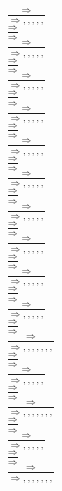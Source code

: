 \documentclass[11pt]{article}
\begin{document}
\begin{center}
\bigskip
\\$\frac{\Rightarrow }{\Rightarrow , , , , , }$
\bigskip
\\$\frac{\Rightarrow }{\Rightarrow }$
\bigskip
\\$\frac{\Rightarrow }{\Rightarrow , , , , , }$
\bigskip
\\$\frac{\Rightarrow }{\Rightarrow }$
\bigskip
\\$\frac{\Rightarrow }{\Rightarrow , , , , , }$
\bigskip
\\$\frac{\Rightarrow }{\Rightarrow }$
\bigskip
\\$\frac{\Rightarrow }{\Rightarrow , , , , , }$
\bigskip
\\$\frac{\Rightarrow }{\Rightarrow }$
\bigskip
\\$\frac{\Rightarrow }{\Rightarrow , , , , , }$
\bigskip
\\$\frac{\Rightarrow }{\Rightarrow }$
\bigskip
\\$\frac{\Rightarrow }{\Rightarrow , , , , , }$
\bigskip
\\$\frac{\Rightarrow }{\Rightarrow }$
\bigskip
\\$\frac{\Rightarrow }{\Rightarrow , , , , , }$
\bigskip
\\$\frac{\Rightarrow }{\Rightarrow }$
\bigskip
\\$\frac{\Rightarrow }{\Rightarrow , , , , , }$
\bigskip
\\$\frac{\Rightarrow }{\Rightarrow }$
\bigskip
\\$\frac{\Rightarrow }{\Rightarrow , , , , , }$
\bigskip
\\$\frac{\Rightarrow }{\Rightarrow }$
\bigskip
\\$\frac{\Rightarrow }{\Rightarrow , , , , , }$
\bigskip
\\$\frac{\Rightarrow }{\Rightarrow }$
\bigskip
\\$\frac{\Rightarrow }{\Rightarrow , , , , , , , }$
\bigskip
\\$\frac{\Rightarrow }{\Rightarrow }$
\bigskip
\\$\frac{\Rightarrow }{\Rightarrow , , , , , }$
\bigskip
\\$\frac{\Rightarrow }{\Rightarrow }$
\bigskip
\\$\frac{\Rightarrow }{\Rightarrow , , , , , , , }$
\bigskip
\\$\frac{\Rightarrow }{\Rightarrow }$
\bigskip
\\$\frac{\Rightarrow }{\Rightarrow , , , , , }$
\bigskip
\\$\frac{\Rightarrow }{\Rightarrow }$
\bigskip
\\$\frac{\Rightarrow }{\Rightarrow , , , , , , , }$

\end{center}
\end{document}
